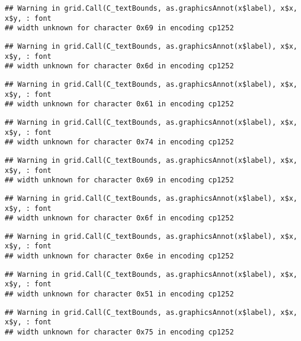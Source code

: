 \documentclass[
]{article}
\begin{document}
\begin{verbatim}
## Warning in grid.Call(C_textBounds, as.graphicsAnnot(x$label), x$x, x$y, : font
## width unknown for character 0x69 in encoding cp1252
\end{verbatim}

\begin{verbatim}
## Warning in grid.Call(C_textBounds, as.graphicsAnnot(x$label), x$x, x$y, : font
## width unknown for character 0x6d in encoding cp1252
\end{verbatim}

\begin{verbatim}
## Warning in grid.Call(C_textBounds, as.graphicsAnnot(x$label), x$x, x$y, : font
## width unknown for character 0x61 in encoding cp1252
\end{verbatim}

\begin{verbatim}
## Warning in grid.Call(C_textBounds, as.graphicsAnnot(x$label), x$x, x$y, : font
## width unknown for character 0x74 in encoding cp1252
\end{verbatim}

\begin{verbatim}
## Warning in grid.Call(C_textBounds, as.graphicsAnnot(x$label), x$x, x$y, : font
## width unknown for character 0x69 in encoding cp1252
\end{verbatim}

\begin{verbatim}
## Warning in grid.Call(C_textBounds, as.graphicsAnnot(x$label), x$x, x$y, : font
## width unknown for character 0x6f in encoding cp1252
\end{verbatim}

\begin{verbatim}
## Warning in grid.Call(C_textBounds, as.graphicsAnnot(x$label), x$x, x$y, : font
## width unknown for character 0x6e in encoding cp1252
\end{verbatim}

\begin{verbatim}
## Warning in grid.Call(C_textBounds, as.graphicsAnnot(x$label), x$x, x$y, : font
## width unknown for character 0x51 in encoding cp1252
\end{verbatim}

\begin{verbatim}
## Warning in grid.Call(C_textBounds, as.graphicsAnnot(x$label), x$x, x$y, : font
## width unknown for character 0x75 in encoding cp1252
\end{verbatim}
\end{document}
